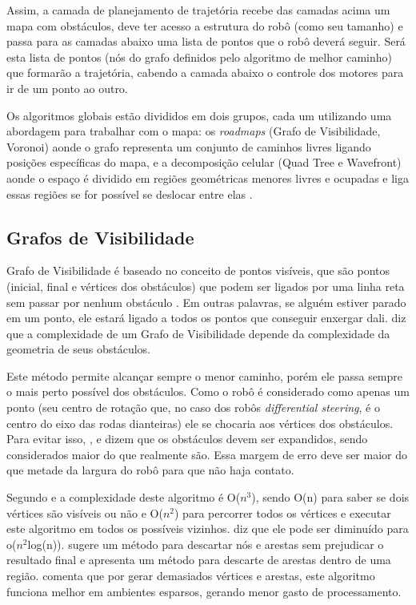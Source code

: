 Assim, a camada de planejamento de trajetória recebe das camadas acima um mapa com obstáculos, deve ter acesso a estrutura do robô (como seu tamanho) e passa para as camadas abaixo uma lista de pontos que o robô deverá seguir. Será esta lista de pontos (nós do grafo definidos pelo algoritmo de melhor caminho) que formarão a trajetória, cabendo a camada abaixo o controle dos motores para ir de um ponto ao outro.

Os algoritmos globais estão divididos em dois grupos, cada um utilizando uma abordagem para trabalhar com o mapa: os \textit{roadmaps} (Grafo de Visibilidade, Voronoi) aonde o grafo representa um conjunto de caminhos livres ligando posições específicas do mapa, e a decomposição celular (Quad Tree e Wavefront) aonde o espaço é dividido em regiões geométricas menores livres e ocupadas e liga essas regiões se for possível se deslocar entre elas \cite{Souza2008}.

\subsection{Grafos de Visibilidade}

Grafo de Visibilidade é baseado no conceito de pontos visíveis, que são pontos (inicial, final e vértices dos obstáculos) que podem ser ligados por uma linha reta sem passar por nenhum obstáculo \cite{Guzman2008}. Em outras palavras, se alguém estiver parado em um ponto, ele estará ligado a todos os pontos que conseguir enxergar dali. \cite{Souza2008} diz que a complexidade de um Grafo de Visibilidade depende da complexidade da geometria de seus obstáculos.

Este método permite alcançar sempre o menor caminho, porém ele passa sempre o mais perto possível dos obstáculos. Como o robô é considerado como apenas um ponto (seu centro de rotação que, no caso dos robôs \textit{differential steering}, é o centro do eixo das rodas dianteiras) ele se chocaria aos vértices dos obstáculos. Para evitar isso, \cite{Souza2008}, \cite{Siegwart2004} e \cite{Thomsen2010} dizem que os obstáculos devem ser expandidos, sendo considerados maior do que realmente são. Essa margem de erro deve ser maior do que metade da largura do robô para que não haja contato.

Segundo \cite{Thomsen2010} e \cite{Choset2005} a complexidade deste algoritmo é O($n^3$), sendo O(n) para saber se dois vértices são visíveis ou não e O($n^2$) para percorrer todos os vértices e executar este algoritmo em todos os possíveis vizinhos. \cite{Thomsen2010} diz que ele pode ser diminuído para o($n^2$log(n)). \cite{Medeiros2011} sugere um método para descartar nós e arestas sem prejudicar o resultado final e \cite{Choset2005} apresenta um método para descarte de arestas dentro de uma região. \cite{Siegwart2004} comenta que por gerar demasiados vértices e arestas, este algoritmo funciona melhor em ambientes esparsos, gerando menor gasto de processamento.

